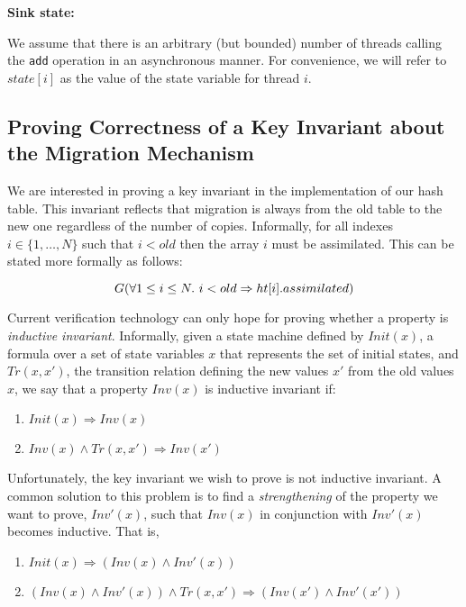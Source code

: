 \noindent \textbf{Sink state:} \vspace{1mm}

\begin{minipage}{\linewidth}
\end{minipage}

We assume that there is an arbitrary (but bounded) number of threads
calling the \texttt{add} operation in an asynchronous manner. For
convenience, we will refer to $state[i]$ as the value of the state
variable for thread $i$.

\subsection{Proving Correctness of a Key Invariant about the Migration Mechanism}

We are interested in proving a key invariant in the implementation of
our hash table. This invariant reflects that migration is always from
the old table to the new one regardless of the number of
copies. Informally, for all indexes $i \in \{1, \ldots, N\}$ such that
$i < old$ then the array $i$ must be assimilated. This can be stated
more formally as follows:

  \[ G(\forall 1 \leq i \leq N.~ i < old \Rightarrow \mbox{$ht[i]$}.assimilated) \]

Current verification technology can only hope for proving whether a
property is \emph{inductive invariant}. Informally, given a state
machine defined by $Init(x)$, a formula over a set of state variables
$x$ that represents the set of initial states, and $Tr(x,x')$, the
transition relation defining the new values $x'$ from the old values
$x$, we say that a property $Inv(x)$ is inductive invariant if:

\begin{enumerate}
\item $Init(x) \Rightarrow Inv(x)$
\item $Inv(x) \wedge Tr(x,x') \Rightarrow Inv(x')$
\end{enumerate}

Unfortunately, the key invariant we wish to prove is not inductive
invariant. A common solution to this problem is to find a
\emph{strengthening} of the property we want to prove, $Inv'(x)$, such
that $Inv(x)$ in conjunction with $Inv'(x)$ becomes inductive. That
is,

\begin{enumerate}
\item $Init(x) \Rightarrow (Inv(x) \wedge Inv'(x))$
\item $(Inv(x) \wedge Inv'(x)) \wedge Tr(x,x') \Rightarrow (Inv(x') \wedge Inv'(x'))$
\end{enumerate}

